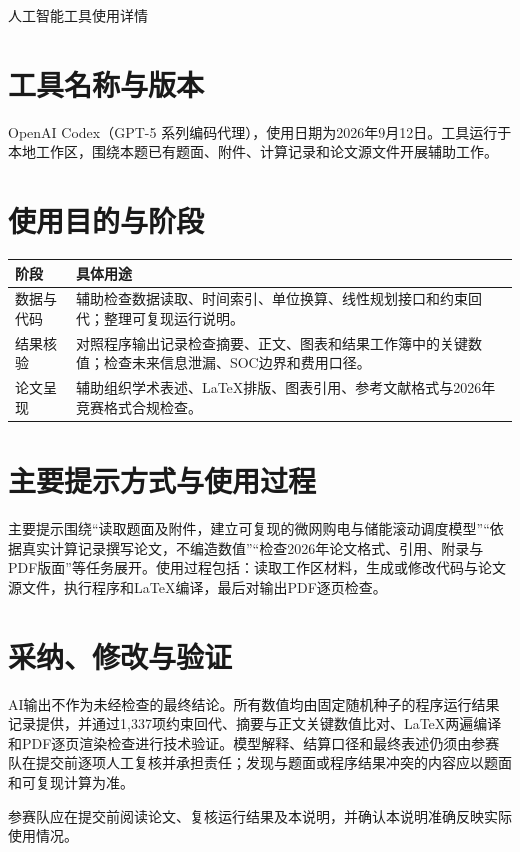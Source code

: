 \documentclass[fontset=fandol,11pt,a4paper]{ctexart}
\begin{document}
\begin{center}
{\heiti 人工智能工具使用详情}
\end{center}

\section{工具名称与版本}
OpenAI Codex（GPT-5 系列编码代理），使用日期为2026年9月12日。工具运行于本地工作区，围绕本题已有题面、附件、计算记录和论文源文件开展辅助工作。

\section{使用目的与阶段}
\begin{longtable}{p{}p{}}
\toprule 阶段 & 具体用途\\\midrule
数据与代码 & 辅助检查数据读取、时间索引、单位换算、线性规划接口和约束回代；整理可复现运行说明。\\
结果核验 & 对照程序输出记录检查摘要、正文、图表和结果工作簿中的关键数值；检查未来信息泄漏、SOC边界和费用口径。\\
论文呈现 & 辅助组织学术表述、LaTeX排版、图表引用、参考文献格式与2026年竞赛格式合规检查。\\
\bottomrule
\end{longtable}

\section{主要提示方式与使用过程}
主要提示围绕“读取题面及附件，建立可复现的微网购电与储能滚动调度模型”“依据真实计算记录撰写论文，不编造数值”“检查2026年论文格式、引用、附录与PDF版面”等任务展开。使用过程包括：读取工作区材料，生成或修改代码与论文源文件，执行程序和LaTeX编译，最后对输出PDF逐页检查。

\section{采纳、修改与验证}
AI输出不作为未经检查的最终结论。所有数值均由固定随机种子的程序运行结果记录提供，并通过1,337项约束回代、摘要与正文关键数值比对、LaTeX两遍编译和PDF逐页渲染检查进行技术验证。模型解释、结算口径和最终表述仍须由参赛队在提交前逐项人工复核并承担责任；发现与题面或程序结果冲突的内容应以题面和可复现计算为准。

参赛队应在提交前阅读论文、复核运行结果及本说明，并确认本说明准确反映实际使用情况。
\end{document}
